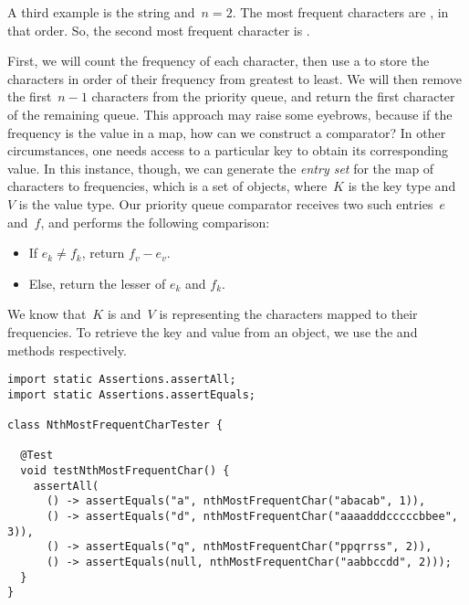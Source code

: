 A third example is the string  and~$n=2$. 
The most frequent characters are , in that order.
So, the second most frequent character is .

First, we will count the frequency of each character, then use a  to store the characters in order of their frequency from greatest to least. 
We will then remove the first~$n-1$ characters from the priority queue, and return the first character of the remaining queue. 
This approach may raise some eyebrows, because if the frequency is the value in a map, how can we construct a comparator? 
In other circumstances, one needs access to a particular key to obtain its corresponding value. 
In this instance, though, we can generate the \emph{entry set} for the map of characters to frequencies, which is a set of  objects, where~$K$ is the key type and~$V$ is the value type. 
Our priority queue comparator receives two such entries~$e$ and~$f$, and performs the following comparison:

\begin{itemize}
  \item If $e_k \neq f_k$, return $f_v - e_v$.
  \item Else, return the lesser of $e_k$ and $f_k$.
\end{itemize}

We know that~$K$ is  and~$V$ is  representing the characters mapped to their frequencies. 
To retrieve the key and value from an  object, we use the  and  methods respectively. 

\begin{lstlisting}[language=MyJava]
import static Assertions.assertAll;
import static Assertions.assertEquals;

class NthMostFrequentCharTester {

  @Test
  void testNthMostFrequentChar() {
    assertAll(
      () -> assertEquals("a", nthMostFrequentChar("abacab", 1)),
      () -> assertEquals("d", nthMostFrequentChar("aaaadddcccccbbee", 3)),
      () -> assertEquals("q", nthMostFrequentChar("ppqrrss", 2)),
      () -> assertEquals(null, nthMostFrequentChar("aabbccdd", 2)));
  }
}
\end{lstlisting}

